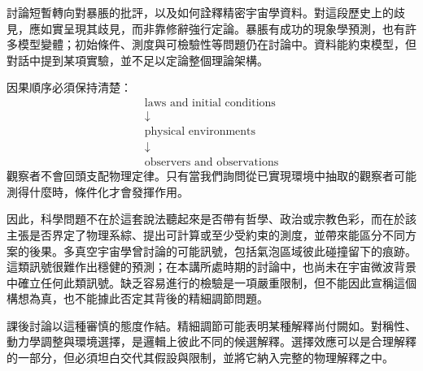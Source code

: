 討論短暫轉向對暴脹的批評，以及如何詮釋精密宇宙學資料。對這段歷史上的歧見，應如實呈現其歧見，而非靠修辭強行定論。暴脹有成功的現象學預測，也有許多模型變體；初始條件、測度與可檢驗性等問題仍在討論中。資料能約束模型，但對話中提到某項實驗，並不足以定論整個理論架構。

\begin{classroomqa}
\end{classroomqa}

\begin{classroomqa}
\end{classroomqa}

因果順序必須保持清楚：
\begin{equation}
\begin{gathered}
\text{laws and initial conditions}\\[-0.15em]
\downarrow\\[-0.15em]
\text{physical environments}\\[-0.15em]
\downarrow\\[-0.15em]
\text{observers and observations}
\end{gathered}
\end{equation}
觀察者不會回頭支配物理定律。只有當我們詢問從已實現環境中抽取的觀察者可能測得什麼時，條件化才會發揮作用。

因此，科學問題不在於這套說法聽起來是否帶有哲學、政治或宗教色彩，而在於該主張是否界定了物理系綜、提出可計算或至少受約束的測度，並帶來能區分不同方案的後果。多真空宇宙學曾討論的可能訊號，包括氣泡區域彼此碰撞留下的痕跡。這類訊號很難作出穩健的預測；在本講所處時期的討論中，也尚未在宇宙微波背景中確立任何此類訊號。缺乏容易進行的檢驗是一項嚴重限制，但不能因此宣稱這個構想為真，也不能據此否定其背後的精細調節問題。

\begin{classroomqa}
\end{classroomqa}

課後討論以這種審慎的態度作結。精細調節可能表明某種解釋尚付闕如。對稱性、動力學調整與環境選擇，是邏輯上彼此不同的候選解釋。選擇效應可以是合理解釋的一部分，但必須坦白交代其假設與限制，並將它納入完整的物理解釋之中。
